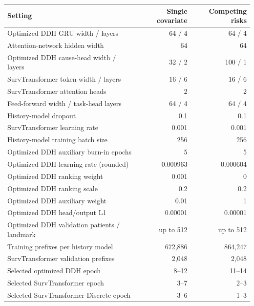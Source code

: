 \begin{center}\begin{minipage}{\textwidth}\centering\small
\begin{tabular}{p{}rr}\toprule
Setting & Single covariate & Competing risks\\\midrule
Optimized DDH GRU width / layers & 64 / 4 & 64 / 4\\
Attention-network hidden width & 64 & 64\\
Optimized DDH cause-head width / layers & 32 / 2 & 100 / 1\\
SurvTransformer token width / layers & 16 / 6 & 16 / 6\\
SurvTransformer attention heads & 2 & 2\\
Feed-forward width / task-head layers & 64 / 4 & 64 / 4\\
History-model dropout & 0.1 & 0.1\\
SurvTransformer learning rate & 0.001 & 0.001\\
History-model training batch size & 256 & 256\\
Optimized DDH auxiliary burn-in epochs & 5 & 5\\
Optimized DDH learning rate (rounded) & 0.000963 & 0.000604\\
Optimized DDH ranking weight & 0.001 & 0\\
Optimized DDH ranking scale & 0.2 & 0.2\\
Optimized DDH auxiliary weight & 0.01 & 1\\
Optimized DDH head/output L1 & 0.00001 & 0.00001\\
Optimized DDH validation patients / landmark & up to 512 & up to 512\\
Training prefixes per history model & 672,886 & 864,247\\
SurvTransformer validation prefixes & 2,048 & 2,048\\
Selected optimized DDH epoch & 8--12 & 11--14\\
Selected SurvTransformer epoch & 3--7 & 2--3\\
Selected SurvTransformer-Discrete epoch & 3--6 & 1--3\\\bottomrule
\end{tabular}
\end{minipage}\end{center}

